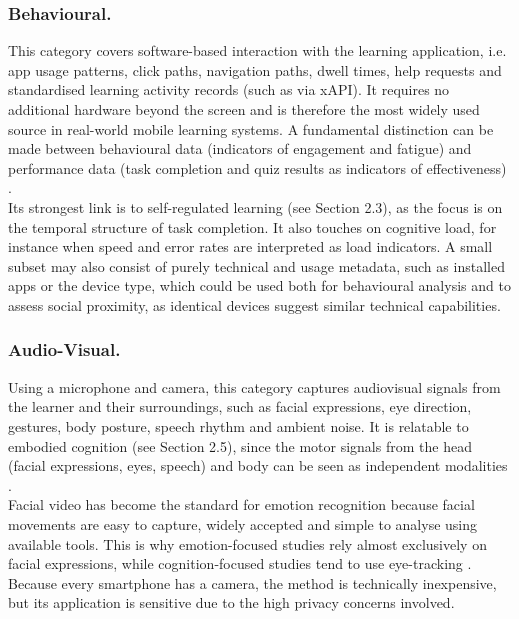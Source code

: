 \documentclass[runningheads]{llncs}
\begin{document}



\subsubsection{Behavioural.}
This category covers software-based interaction with the learning application, i.e. app usage patterns, click paths, navigation paths, dwell times, help requests and standardised learning activity records (such as via xAPI). It requires no additional hardware beyond the screen and is therefore the most widely used source in real-world mobile learning systems. A fundamental distinction can be made between behavioural data (indicators of engagement and fatigue) and performance data (task completion and quiz results as indicators of effectiveness) \cite{youssef_when_2025}.\\
Its strongest link is to self-regulated learning (see Section 2.3), as the focus is on the temporal structure of task completion. It also touches on cognitive load, for instance when speed and error rates are interpreted as load indicators. A small subset may also consist of purely technical and usage metadata, such as installed apps or the device type, which could be used both for behavioural analysis and to assess social proximity, as identical devices suggest similar technical capabilities.

\subsubsection{Audio-Visual.}

Using a microphone and camera, this category captures audiovisual signals from the learner and their surroundings, such as facial expressions, eye direction, gestures, body posture, speech rhythm and ambient noise. It is relatable to embodied cognition (see Section 2.5), since the motor signals from the head (facial expressions, eyes, speech) and body can be seen as independent modalities \cite{di_mitri_signals_2018}.\\ %
Facial video has become the standard for emotion recognition because facial movements are easy to capture, widely accepted and simple to analyse using available tools. This is why emotion-focused studies rely almost exclusively on facial expressions, while cognition-focused studies tend to use eye-tracking \cite{giannakos_role_2023}. Because every smartphone has a camera, the method is technically inexpensive, but its application is sensitive due to the high privacy concerns involved. %
\end{document}
